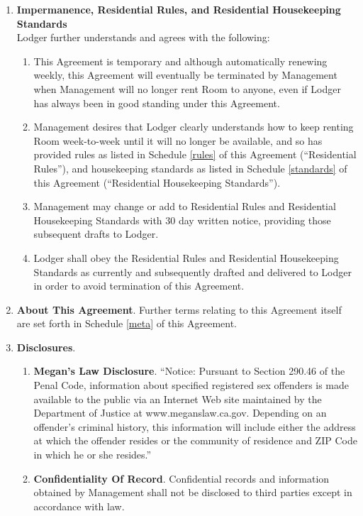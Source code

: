 \documentclass[]{article}
\newcommand{\rules}{Residential Rules}
\newcommand{\standards}{Residential Housekeeping Standards}
\newcommand{\meta}{About This Agreement}
\newcommand{\management}{Management}
\newcommand{\room}{Room}
\begin{document}
\begin{enumerate}
		\item \textbf{Impermanence, \rules{}, and \standards{}}\\
			Lodger further understands and agrees with the following: 
			\begin{enumerate}
				\item This Agreement is temporary and although automatically renewing weekly, this Agreement will eventually be terminated by \management{} when \management{} will no longer rent \room{} to anyone, even if Lodger has always been in good standing under this Agreement. 
				\item \management{} desires that Lodger clearly understands how to keep renting \room{} week-to-week until it will no longer be available, and so has provided rules as listed in Schedule \ref{rules} of this Agreement (``\rules{}''), and housekeeping standards as listed in Schedule \ref{standards} of this Agreement (``\standards{}''). 
				\item \management{} may change or add to \rules{} and \standards{} with 30 day written notice, providing those subsequent drafts to Lodger.
				\item Lodger shall obey the \rules{} and \standards{} as currently and subsequently drafted and delivered to Lodger in order to avoid termination of this Agreement.
			\end{enumerate}

		\item \textbf{\meta{}}.
			Further terms relating to this Agreement itself are set forth in Schedule \ref{meta} of this Agreement.

		\item \textbf{Disclosures}. 
			\begin{enumerate}
				\item \textbf{Megan's Law Disclosure}.
					``Notice: Pursuant to Section 290.46 of the Penal Code, information about specified registered sex offenders is made available to the public via an Internet Web site maintained by the Department of Justice at www.meganslaw.ca.gov. Depending on an offender's criminal history, this information will include either the address at which the offender resides or the community of residence and ZIP Code in which he or she resides.''
				\item \textbf{Confidentiality Of Record}. 
					Confidential records and information obtained by \management{} shall not be disclosed to third parties except in accordance with law. 
			\end{enumerate}


\end{enumerate}
\end{document}
